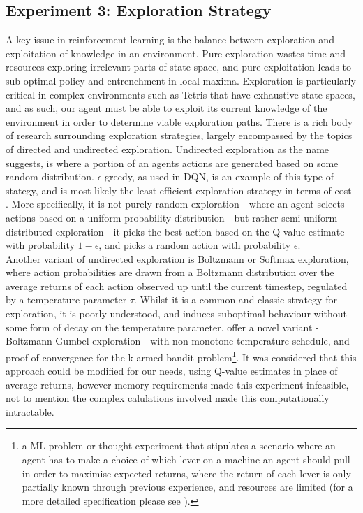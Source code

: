 \documentclass[12pt]{article}
\begin{document}
\subsection{Experiment 3: Exploration Strategy}
A key issue in reinforcement learning is the balance between exploration and exploitation of knowledge in an environment. Pure exploration wastes time and resources exploring irrelevant parts of state space, and pure exploitation leads to sub-optimal policy and entrenchment in local maxima. Exploration is particularly critical in complex environments such as Tetris that have exhaustive state spaces, and as such, our agent must be able to exploit its current knowledge of the environment in order to determine viable exploration paths. There is a rich body of research surrounding exploration strategies, largely encompassed by the topics of directed and undirected exploration. Undirected exploration as the name suggests, is where a portion of an agents actions are generated based on some random distribution. $\epsilon$-greedy, as used in DQN, is an example of this type of stategy, and is most likely the least efficient exploration strategy in terms of cost \autocite{Thrun92efficientexploration}. More specifically, it is not purely random exploration - where an agent selects actions based on a uniform probability distribution - but rather semi-uniform distributed exploration - it picks the best action based on the Q-value estimate with probability $1-\epsilon$, and picks a random action with probability $\epsilon$. \\\newline
Another variant of undirected exploration is Boltzmann or Softmax exploration, where action probabilities are drawn from a Boltzmann distribution \autocite{boltzmann1868studien} over the average returns of each action observed up until the current timestep, regulated by a temperature parameter $\tau$. Whilst it is a common and classic strategy for exploration, it is poorly understood, and induces suboptimal behaviour without some form of decay on the temperature parameter. \textcite{cesa2017boltzmann} offer a novel variant - Boltzmann-Gumbel exploration - with non-monotone temperature schedule, and proof of convergence for the k-armed bandit problem\footnote[2]{a ML problem or thought experiment that stipulates a scenario where an agent has to make a choice of which lever on a machine an agent should pull in order to maximise expected returns, where the return of each lever is only partially known through previous experience, and resources are limited (for a more detailed specification please see \textcite{Katehakis1987TheMB}).}. It was considered that this approach could be modified for our needs, using Q-value estimates in place of average returns, however memory requirements made this experiment infeasible, not to mention the complex calulations involved made this computationally intractable. \\\newline
\end{document}
